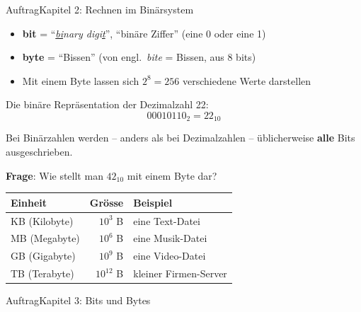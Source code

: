 \begin{frame}{Auftrag}{Kapitel 2: Rechnen im Binärsystem}
\\[3mm]
\end{frame}

{
\begin{frame}
\end{frame}}

\begin{frame}
\begin{itemize}[<+->]
	\item \textbf{bit} = \enquote{\textit{\underline{bi}nary digi\underline{t}}}, \enquote{binäre Ziffer} (eine 0 oder eine 1)
	\item \textbf{byte} = \enquote{Bissen} (von engl.\ \textit{bite} = Bissen, aus 8 bits) 
	\item Mit einem Byte lassen sich $2^8=256$ verschiedene Werte darstellen
\end{itemize}
\end{frame}

\begin{frame}
Die binäre Repräsentation der Dezimalzahl 22:
\[00010110_2 = 22_{10}\]
\begin{center}
Bei Binärzahlen werden -- anders als bei Dezimalzahlen -- üblicherweise \textbf{alle} Bits ausgeschrieben.
\end{center}
\vspace{3mm}
\begin{center}
\textbf{Frage}: Wie stellt man $42_{10}$ mit einem Byte dar?
\end{center}
\end{frame}

\begin{frame}
\begin{table}[H]
	\footnotesize
	\centering
	\begin{tabular}{@{}l|rl@{}}
		\toprule
		\textbf{Einheit} & \textbf{Grösse} & Beispiel \\ \midrule
		KB (Kilobyte) & $10^3$ B & eine Text-Datei \\
		MB (Megabyte) & $10^6$ B & eine Musik-Datei \\
		GB (Gigabyte) & $10^9$ B & eine Video-Datei \\
		TB (Terabyte) & $10^{12}$ B & kleiner Firmen-Server \\
		\bottomrule
	\end{tabular}
\end{table}
\end{frame}

\begin{frame}{Auftrag}{Kapitel 3: Bits und Bytes}
\\[3mm]
\end{frame}

